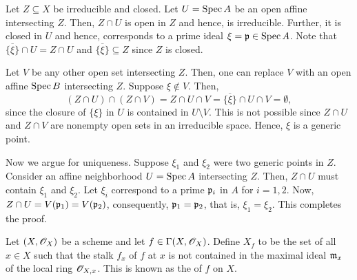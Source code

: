 \setcounter{exercise}{8}
\begin{exercise}
    Let $Z\subseteq X$ be irreducible and closed. Let $U = \operatorname{Spec} A$ be an open affine intersecting $Z$. Then, $Z\cap U$ is open in $Z$ and hence, is irreducible. Further, it is closed in $U$ and hence, corresponds to a prime ideal $\xi = \mathfrak{p}\in\operatorname{Spec} A$. Note that $\overline{\{\xi\}}\cap U = Z\cap U$ and $\overline{\{\xi\}}\subseteq Z$ since $Z$ is closed.

    Let $V$ be any other open set intersecting $Z$. Then, one can replace $V$ with an open affine $\operatorname{Spec} B$ intersecting $Z$. Suppose $\xi\notin V$. Then, 
    \begin{equation*}
        (Z\cap U)\cap (Z\cap V) = Z\cap U\cap V = \overline{\{\xi\}}\cap U\cap V = \emptyset,
    \end{equation*}
    since the closure of $\{\xi\}$ in $U$ is contained in $U\setminus V$. This is not possible since $Z\cap U$ and $Z\cap V$ are nonempty open sets in an irreducible space. Hence, $\xi$ is a generic point.


    Now we argue for uniqueness. Suppose $\xi_1$ and $\xi_2$ were two generic points in $Z$. Consider an affine neighborhood $U = \operatorname{Spec} A$ intersecting $Z$. Then, $Z\cap U$ must contain $\xi_1$ and $\xi_2$. Let $\xi_i$ correspond to a prime $\mathfrak{p}_i$ in $A$ for $i = 1,2$. Now, $Z\cap U = V(\mathfrak{p}_1) = V(\mathfrak{p}_2)$, consequently, $\mathfrak{p}_1 = \mathfrak{p}_2$, that is, $\xi_1 = \xi_2$. This completes the proof.
\end{exercise}

\begin{definition}
    Let $(X,\mathscr{O}_X)$ be a scheme and let $f\in\Gamma(X,\mathscr{O}_X)$. Define $X_f$ to be the set of all $x\in X$ such that the stalk $f_x$ of $f$ at $x$ is not contained in the maximal ideal $\mathfrak{m}_x$ of the local ring $\mathscr{O}_{X, x}$. This is known as the  of $f$ on $X$.
\end{definition}

